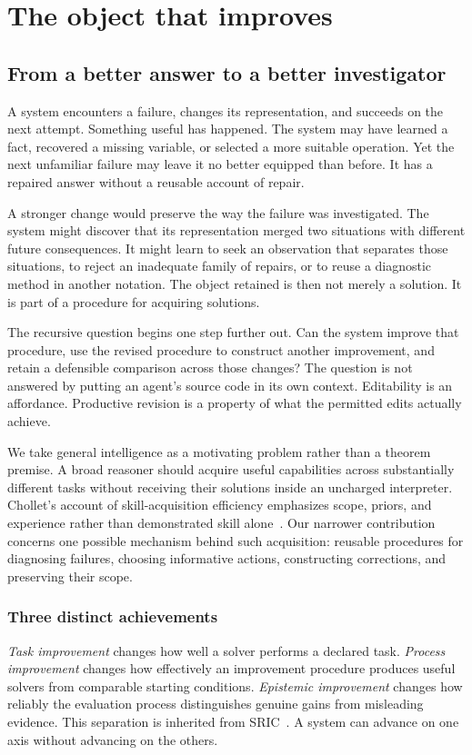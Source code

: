 
\chapter{The object that improves}\label{SII:book:chapter-59}

\section{From a better answer to a better investigator}\label{SII:sec:introduction}
A system encounters a failure, changes its representation, and succeeds on the next attempt. Something useful has happened. The system may have learned a fact, recovered a missing variable, or selected a more suitable operation. Yet the next unfamiliar failure may leave it no better equipped than before. It has a repaired answer without a reusable account of repair.

A stronger change would preserve the way the failure was investigated. The system might discover that its representation merged two situations with different future consequences. It might learn to seek an observation that separates those situations, to reject an inadequate family of repairs, or to reuse a diagnostic method in another notation. The object retained is then not merely a solution. It is part of a procedure for acquiring solutions.

The recursive question begins one step further out. Can the system improve that procedure, use the revised procedure to construct another improvement, and retain a defensible comparison across those changes? The question is not answered by putting an agent's source code in its own context. Editability is an affordance. Productive revision is a property of what the permitted edits actually achieve.

We take general intelligence as a motivating problem rather than a theorem premise. A broad reasoner should acquire useful capabilities across substantially different tasks without receiving their solutions inside an uncharged interpreter. Chollet's account of skill-acquisition efficiency emphasizes scope, priors, and experience rather than demonstrated skill alone~\cite{SII:chollet}. Our narrower contribution concerns one possible mechanism behind such acquisition: reusable procedures for diagnosing failures, choosing informative actions, constructing corrections, and preserving their scope.

\subsection{Three distinct achievements}
\emph{Task improvement} changes how well a solver performs a declared task. \emph{Process improvement} changes how effectively an improvement procedure produces useful solvers from comparable starting conditions. \emph{Epistemic improvement} changes how reliably the evaluation process distinguishes genuine gains from misleading evidence. This separation is inherited from SRIC~\cite{SII:sric}. A system can advance on one axis without advancing on the others.

